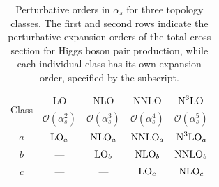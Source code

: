 \begin{table}[hbt!]
    \centering
\begin{tabular}{ccccc}
    \toprule
        \multirow{2}{*}{Class}    &  LO  & NLO  & NNLO  & $\textup{N}^3\textup{LO}$  \\
      &  $\mathcal{O}(\alpha_s^2)$  &   $\mathcal{O}(\alpha_s^3)$ &   $\mathcal{O}(\alpha_s^4)$  & $\mathcal{O}(\alpha_s^5)$
     \\
    \midrule
    $a$ &  $\textup{LO}_a$  &   $\textup{NLO}_a$ &   $\textup{NNLO}_a$  & $\textup{N}^3\textup{LO}_a$
     \\
     $b$ &  --- &   $\textup{LO}_b$ &   $\textup{NLO}_b$  &  $\textup{NNLO}_b$
     \\
    $c$ & --- &  --- &   $\textup{LO}_c$  & $\textup{NLO}_c$
     \\
    \bottomrule
    \end{tabular}
            \caption{Perturbative orders in $\alpha_s$ for three topology classes.
    The first and second rows indicate the perturbative expansion orders of the total cross section for Higgs boson pair production,
    while each individual class has its own expansion order, specified by the subscript.}
    \label{tab:my_label}
\end{table}

